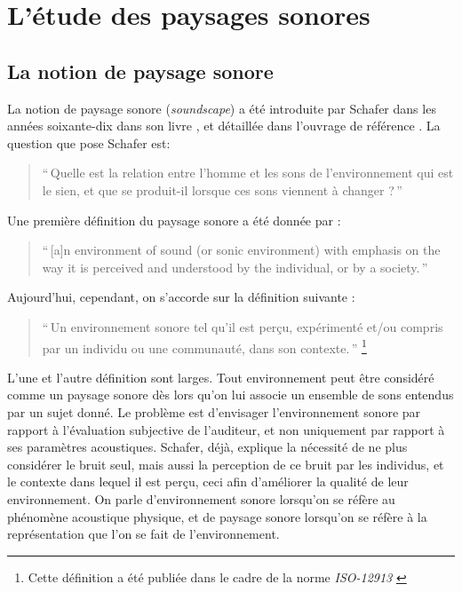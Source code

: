 {

\section{L'étude des paysages sonores}
\label{sec:paysageSonore}

\subsection{La notion de paysage sonore}

La notion de paysage sonore (\emph{soundscape}) a été introduite par Schafer dans les années soixante-dix dans son livre \citep{schafer1969new}, et détaillée dans l'ouvrage de référence \citep{schafer1977tuning}. La question que pose Schafer est:

\begin{quote}
``\,Quelle est la relation entre l'homme et les sons de l'environnement qui est le sien, et que se produit-il lorsque ces sons viennent à changer ?\,''
\end{quote}

Une première définition du paysage sonore a été donnée par \citep{truax1978handbook}:

\begin{quote}
``\,[a]n environment of sound (or sonic environment) with emphasis on the way it is perceived and understood by the individual, or by a society.\,'' 
\end{quote}

Aujourd'hui, cependant, on s'accorde sur la définition suivante \citep{aletta2016soundscape}:

\begin{quote}
``\,Un environnement sonore tel qu'il est perçu, expérimenté et/ou compris par un individu ou une communauté, dans son contexte.\,'' \footnote{Cette définition a été publiée dans le cadre de la norme \emph{ISO-12913} \citep{iso12913}}
\end{quote}

L'une et l'autre définition sont larges. Tout environnement peut être considéré comme un paysage sonore dès lors qu'on lui associe un ensemble de sons entendus par un sujet donné. Le problème est d'envisager l’environnement sonore par rapport à l'évaluation subjective de l'auditeur, et non uniquement par rapport à ses paramètres acoustiques. Schafer, déjà, explique la nécessité de ne plus considérer le bruit seul, mais aussi la perception de ce bruit par les individus, et le contexte dans lequel il est perçu, ceci afin d'améliorer la qualité de leur environnement. On parle d'environnement sonore lorsqu'on se réfère au phénomène acoustique physique, et de paysage sonore lorsqu'on se réfère à la représentation que l'on se fait de l'environnement.

}

